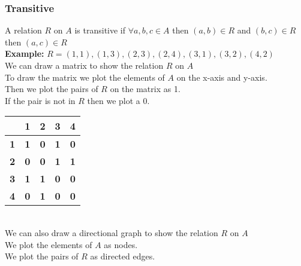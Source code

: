 \subsubsection{Transitive}
A relation $R$ on $A$ is transitive if $\forall a,b,c \in A$ then $(a,b) \in R$ and $(b,c) \in R$ then $(a,c) \in R$ \\

\textbf{Example:}
$R ={(1,1),(1,3),(2,3),(2,4),(3,1),(3,2),(4,2)}$ \\
We can draw a matrix to show the relation $R$ on $A$ \\
To draw the matrix we plot the elements of $A$ on the x-axis and y-axis. \\
Then we plot the pairs of $R$ on the matrix as 1. \\
If the pair is not in $R$ then we plot a 0. \\
\begin{tabular}{|c|c|c|c|c|}
\hline
\multicolumn{1}{|c|}{\textbf{}} & \multicolumn{1}{c|}{\textbf{1}} & \multicolumn{1}{c|}{\textbf{2}} & \multicolumn{1}{c|}{\textbf{3}} & \multicolumn{1}{c|}{\textbf{4}} \\ \hline
\multicolumn{1}{|c|}{\textbf{1}} & \multicolumn{1}{c|}{\textbf{1}} & \multicolumn{1}{c|}{\textbf{0}} & \multicolumn{1}{c|}{\textbf{1}} & \multicolumn{1}{c|}{\textbf{0}} \\ \hline
\multicolumn{1}{|c|}{\textbf{2}} & \multicolumn{1}{c|}{\textbf{0}} & \multicolumn{1}{c|}{\textbf{0}} & \multicolumn{1}{c|}{\textbf{1}} & \multicolumn{1}{c|}{\textbf{1}} \\ \hline
\multicolumn{1}{|c|}{\textbf{3}} & \multicolumn{1}{c|}{\textbf{1}} & \multicolumn{1}{c|}{\textbf{1}} & \multicolumn{1}{c|}{\textbf{0}} & \multicolumn{1}{c|}{\textbf{0}} \\ \hline
\multicolumn{1}{|c|}{\textbf{4}} & \multicolumn{1}{c|}{\textbf{0}} & \multicolumn{1}{c|}{\textbf{1}} & \multicolumn{1}{c|}{\textbf{0}} & \multicolumn{1}{c|}{\textbf{0}} \\ \hline
\end{tabular} \\
We can also draw a directional graph to show the relation $R$ on $A$ \\
We plot the elements of $A$ as nodes. \\
We plot the pairs of $R$ as directed edges. \\
 \\

